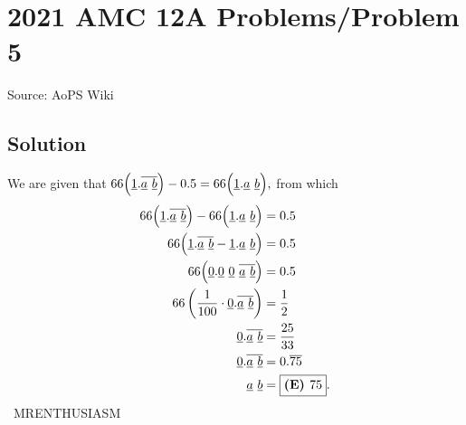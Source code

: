 \documentclass[12pt]{article}
\begin{document}
\section*{{2021 AMC 12A Problems/Problem 5}}
Source: AoPS Wiki

\subsection*{Solution}
We are given that $66\Bigl(\underline{1}.\overline{\underline{a} \ \underline{b}}\Bigr)-0.5=66\Bigl(\underline{1}.\underline{a} \ \underline{b}\Bigr),$ from which \begin{align*} 66\Bigl(\underline{1}.\overline{\underline{a} \ \underline{b}}\Bigr)-66\Bigl(\underline{1}.\underline{a} \ \underline{b}\Bigr)&=0.5 \\ 66\Bigl(\underline{1}.\overline{\underline{a} \ \underline{b}} - \underline{1}.\underline{a} \ \underline{b}\Bigr)&=0.5 \\ 66\Bigl(\underline{0}.\underline{0} \ \underline{0} \ \overline{\underline{a} \ \underline{b}}\Bigr)&=0.5 \\ 66\left(\frac{1}{100}\cdot\underline{0}.\overline{\underline{a} \ \underline{b}}\right)&=\frac12 \\ \underline{0}.\overline{\underline{a} \ \underline{b}}&=\frac{25}{33} \\ \underline{0}.\overline{\underline{a} \ \underline{b}}&=0.\overline{75} \\ \underline{a} \ \underline{b}&=\boxed{\textbf{(E) }75}. \end{align*} ~MRENTHUSIASM
\end{document}
